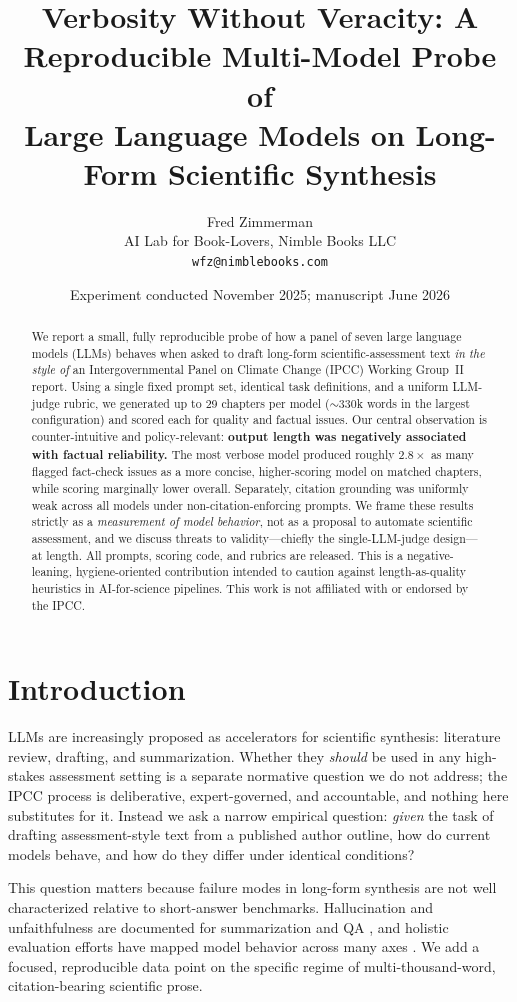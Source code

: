 \documentclass[11pt]{article}
\title{Verbosity Without Veracity: A Reproducible Multi-Model Probe of\\
Large Language Models on Long-Form Scientific Synthesis}
\author{Fred Zimmerman\\
\small AI Lab for Book-Lovers, Nimble Books LLC\\
\small \texttt{wfz@nimblebooks.com}}
\date{Experiment conducted November 2025; manuscript June 2026}
\begin{document}
\maketitle

\begin{abstract}
We report a small, fully reproducible probe of how a panel of seven large language
models (LLMs) behaves when asked to draft long-form scientific-assessment text
\emph{in the style of} an Intergovernmental Panel on Climate Change (IPCC)
Working Group~II report. Using a single fixed prompt set, identical task definitions,
and a uniform LLM-judge rubric, we generated up to 29 chapters per model
($\sim$330k words in the largest configuration) and scored each for quality and
factual issues. Our central observation is counter-intuitive and policy-relevant:
\textbf{output length was negatively associated with factual reliability.} The most
verbose model produced roughly $2.8\times$ as many flagged fact-check issues as a more
concise, higher-scoring model on matched chapters, while scoring marginally lower
overall. Separately, citation grounding was uniformly weak across all models under
non-citation-enforcing prompts. We frame these results strictly as a
\emph{measurement of model behavior}, not as a proposal to automate scientific
assessment, and we discuss threats to validity---chiefly the single-LLM-judge
design---at length. All prompts, scoring code, and rubrics are released. This is a
negative-leaning, hygiene-oriented contribution intended to caution against
length-as-quality heuristics in AI-for-science pipelines. This work is not
affiliated with or endorsed by the IPCC.
\end{abstract}

\section{Introduction}
LLMs are increasingly proposed as accelerators for scientific synthesis: literature
review, drafting, and summarization. Whether they \emph{should} be used in any
high-stakes assessment setting is a separate normative question we do not address;
the IPCC process is deliberative, expert-governed, and accountable, and nothing here
substitutes for it. Instead we ask a narrow empirical question: \emph{given} the task
of drafting assessment-style text from a published author outline, how do current
models behave, and how do they differ under identical conditions?

This question matters because failure modes in long-form synthesis are not well
characterized relative to short-answer benchmarks. Hallucination and unfaithfulness
are documented for summarization and QA \citep{maynez2020faithfulness, ji2023survey,
lin2021truthfulqa}, and holistic evaluation efforts have mapped model behavior across
many axes \citep{liang2022holistic}. We add a focused, reproducible data point on the
specific regime of multi-thousand-word, citation-bearing scientific prose.
\end{document}
